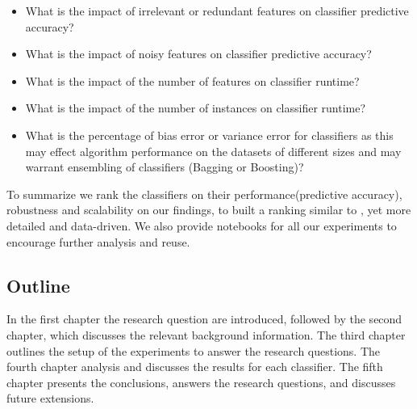 \documentclass[a4paper,10pt]{article}
\begin{document}


\begin{itemize}
	\item What is the impact of irrelevant or redundant features on classifier predictive accuracy?
	\item What is the impact of noisy features on classifier predictive accuracy?
	\item What is the impact of the number of features on classifier runtime?
	\item What is the impact of the number of instances on classifier runtime?

	\item What is the percentage of bias error or variance error for classifiers as this may effect algorithm performance on the datasets of different sizes and may warrant ensembling of classifiers (Bagging or Boosting)?
\end{itemize}

To summarize we rank the classifiers on their performance(predictive accuracy), robustness and scalability on our findings, to built a ranking similar to \cite{RevClass}, yet more detailed and data-driven.  We also provide notebooks for all our experiments to encourage further analysis and reuse.




\subsection{Outline}
In the first chapter the research question are introduced, followed by the second chapter, which discusses the relevant background information. The third chapter outlines the setup of the experiments to answer the research questions. The fourth chapter analysis and discusses the results for each classifier. The fifth chapter presents the conclusions, answers the research questions, and discusses future extensions.
\end{document}
